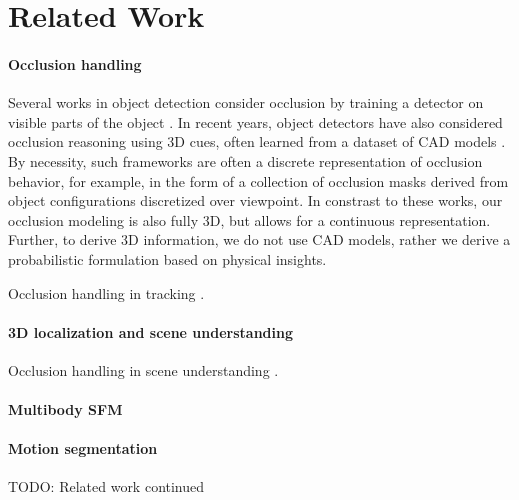 \section{Related Work}
\label{sec:related}


\paragraph{Occlusion handling}
Several works in object detection consider occlusion by training a detector on visible parts of the object \cite{Gao_etal_2011,Wu_Nevatia_2007}. In recent years, object detectors have also considered occlusion reasoning using 3D cues, often learned from a dataset of CAD models \cite{Pepik_etal_2012,Pepik_etal_2013,Xiang_Savarese_2013}. By necessity, such frameworks are often a discrete representation of occlusion behavior, for example, in the form of a collection of occlusion masks derived from object configurations discretized over viewpoint. In constrast to these works, our occlusion modeling is also fully 3D, but allows for a continuous representation. Further, to derive 3D information, we do not use CAD models, rather we derive a probabilistic formulation based on physical insights.

Occlusion handling in tracking \cite{Wu_Nevatia_2007,Milan_etal_2014}.


\paragraph{3D localization and scene understanding}
Occlusion handling in scene understanding \cite{Zia_etal_2013,Zia_etal_2014}.


\paragraph{Multibody SFM}


\paragraph{Motion segmentation}






TODO:
\vfill
\pagebreak
Related work continued
\vspace{15cm}

